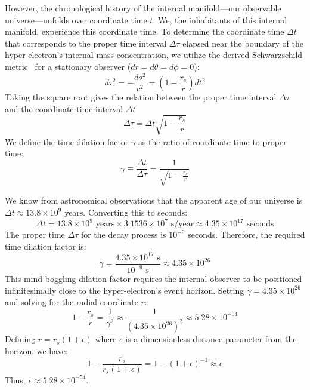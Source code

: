 However, the chronological history of the internal manifold—our observable universe—unfolds over coordinate time $t$. We, the inhabitants of this internal manifold, experience this coordinate time. To determine the coordinate time $\Delta t$ that corresponds to the proper time interval $\Delta \tau$ elapsed near the boundary of the hyper-electron's internal mass concentration, we utilize the derived Schwarzschild metric~\cite{Penrose1965} for a stationary observer ($dr = d\theta = d\phi = 0$):
\begin{equation}
d\tau^2 = - \frac{ds^2}{c^2} = \left(1 - \frac{r_s}{r}\right) dt^2
\end{equation}
Taking the square root gives the relation between the proper time interval $\Delta \tau$ and the coordinate time interval $\Delta t$:
\begin{equation}
\Delta \tau = \Delta t \sqrt{1 - \frac{r_s}{r}}
\end{equation}
We define the time dilation factor $\gamma$ as the ratio of coordinate time to proper time:
\begin{equation}
\gamma \equiv \frac{\Delta t}{\Delta \tau} = \frac{1}{\sqrt{1 - \frac{r_s}{r}}}
\end{equation}

We know from astronomical observations that the apparent age of our universe is $\Delta t \approx 13.8 \times 10^9$ years. Converting this to seconds:
\begin{equation}
\Delta t = 13.8 \times 10^9 \text{ years} \times 3.1536 \times 10^7 \text{ s/year} \approx 4.35 \times 10^{17} \text{ seconds}
\end{equation}
The proper time $\Delta \tau$ for the decay process is $10^{-9}$ seconds. Therefore, the required time dilation factor is:
\begin{equation}
\gamma = \frac{4.35 \times 10^{17} \text{ s}}{10^{-9} \text{ s}} \approx 4.35 \times 10^{26}
\end{equation}
This mind-boggling dilation factor requires the internal observer to be positioned infinitesimally close to the hyper-electron's event horizon. Setting $\gamma = 4.35 \times 10^{26}$ and solving for the radial coordinate $r$:
\begin{equation}
1 - \frac{r_s}{r} = \frac{1}{\gamma^2} \approx \frac{1}{(4.35 \times 10^{26})^2} \approx 5.28 \times 10^{-54}
\end{equation}
Defining $r = r_s(1 + \epsilon)$ where $\epsilon$ is a dimensionless distance parameter from the horizon, we have:
\begin{equation}
1 - \frac{r_s}{r_s(1+\epsilon)} = 1 - (1+\epsilon)^{-1} \approx \epsilon
\end{equation}
Thus, $\epsilon \approx 5.28 \times 10^{-54}$. 

